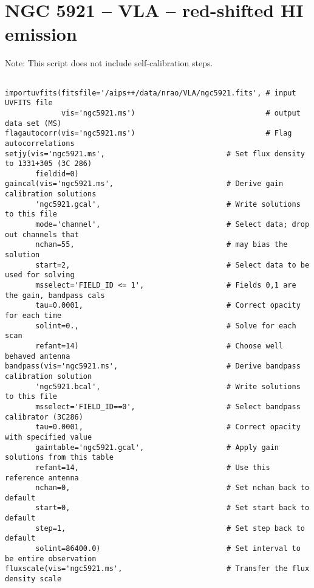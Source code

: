 \section{NGC 5921 -- VLA -- red-shifted HI emission}
\label{section:ngc5921.example}

Note: This script does not include self-calibration steps.

\small
\begin{verbatim}

importuvfits(fitsfile='/aips++/data/nrao/VLA/ngc5921.fits', # input UVFITS file
             vis='ngc5921.ms')                              # output data set (MS)
flagautocorr(vis='ngc5921.ms')                              # Flag autocorrelations
setjy(vis='ngc5921.ms',	                           # Set flux density  to 1331+305 (3C 286)
       fieldid=0)
gaincal(vis='ngc5921.ms',                          # Derive gain calibration solutions
       'ngc5921.gcal',                             # Write solutions to this file
       mode='channel',                             # Select data; drop out channels that
       nchan=55,                                   # may bias the solution
       start=2,                                    # Select data to be used for solving
       msselect='FIELD_ID <= 1',                   # Fields 0,1 are the gain, bandpass cals
       tau=0.0001,                                 # Correct opacity for each time
       solint=0.,                                  # Solve for each scan
       refant=14)                                  # Choose well behaved antenna
bandpass(vis='ngc5921.ms',                         # Derive bandpass calibration solution
       'ngc5921.bcal',                             # Write solutions to this file
       msselect='FIELD_ID==0',                     # Select bandpass calibrator (3C286)
       tau=0.0001,                                 # Correct opacity with specified value
       gaintable='ngc5921.gcal',                   # Apply gain solutions from this table
       refant=14,                                  # Use this reference antenna
       nchan=0,                                    # Set nchan back to default
       start=0,                                    # Set start back to default
       step=1,                                     # Set step back to default
       solint=86400.0)                             # Set interval to be entire observation
fluxscale(vis='ngc5921.ms',                        # Transfer the flux density scale

\end{verbatim}
